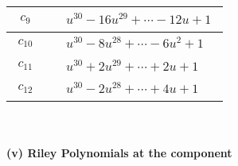 \documentclass[1p]{elsarticle_modified}
\theoremstyle{definition}
\begin{document}
\begin{tabular}{m{50pt}|m{274pt}}
\hline $$\begin{aligned}c_{9}\end{aligned}$$&$\begin{aligned}
&u^{30}-16 u^{29}+\cdots-12 u+1
\end{aligned}$\\
\hline $$\begin{aligned}c_{10}\end{aligned}$$&$\begin{aligned}
&u^{30}-8 u^{28}+\cdots-6 u^2+1
\end{aligned}$\\
\hline $$\begin{aligned}c_{11}\end{aligned}$$&$\begin{aligned}
&u^{30}+2 u^{29}+\cdots+2 u+1
\end{aligned}$\\
\hline $$\begin{aligned}c_{12}\end{aligned}$$&$\begin{aligned}
&u^{30}-2 u^{28}+\cdots+4 u+1
\end{aligned}$\\
\hline
\end{tabular}\\~\\
\newpage\renewcommand{\arraystretch}{1}
\flushleft \textbf{(v) Riley Polynomials at the component}\newline \\
\end{document}
